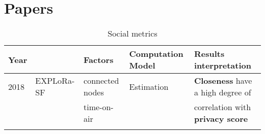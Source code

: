 \onecolumn
\section{Papers}
\setlength{\hoffset}{-.5in}
\pagestyle{empty}

\begin{longtable}{lllll}
	Year  & \                                              & \textbf{Factors}                 & \textbf{Computation Model}       & \textbf{Results interpretation}                               \\\hline
	2018  & EXPLoRa-SF \cite{cuomo_explora_2017}           & connected nodes            & Estimation                       & \textbf{Closeness} have a high degree of                      \\
	\     &                                                & time-on-air               &                                  & correlation with \textbf{privacy score}                       \\\hline

\caption{Social metrics}
\end{longtable}

\clearpage
\newpage
\setlength{\hoffset}{-0in}
\twocolumn